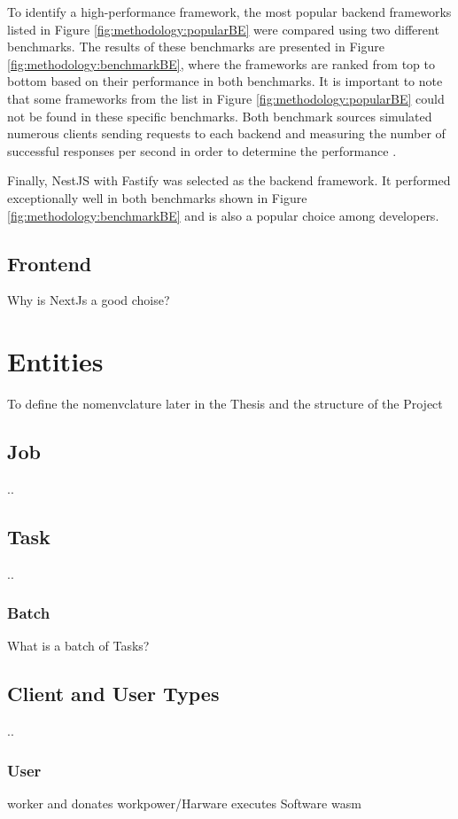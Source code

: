 To identify a high-performance framework, the most popular backend frameworks listed in Figure \ref{fig:methodology:popularBE} were compared using two different benchmarks. The results of these benchmarks are presented in Figure \ref{fig:methodology:benchmarkBE}, where the frameworks are ranked from top to bottom based on their performance in both benchmarks. It is important to note that some frameworks from the list in Figure \ref{fig:methodology:popularBE} could not be found in these specific benchmarks. Both benchmark sources simulated numerous clients sending requests to each backend and measuring the number of successful responses per second in order to determine the performance \cite{backend:benchmark1, backend:benchmark2}.

Finally, NestJS with Fastify was selected as the backend framework. It performed exceptionally well in both benchmarks shown in Figure \ref{fig:methodology:benchmarkBE} and is also a popular choice among developers.

\subsection{Frontend}
\label{subsec:methodology:frameworks:frontend}
Why is NextJs a good choise?

\section{Entities}
\label{sec:methodology:entities}
To define the nomenvclature later in the Thesis and the structure of the Project
\subsection{Job}
\label{subsec:methodology:entities:job}
..
\subsection{Task}
\label{subsec:methodology:entities:task}
..
\subsubsection{Batch}
\label{ssubsec:methodology:entities:task:batch}
What is a batch of Tasks?
\subsection{Client and User Types}
\label{subsec:methodology:entities:client}
..
\subsubsection{User}
\label{ssubsec:methodology:entities:client:user}
worker and donates workpower/Harware executes Software wasm
